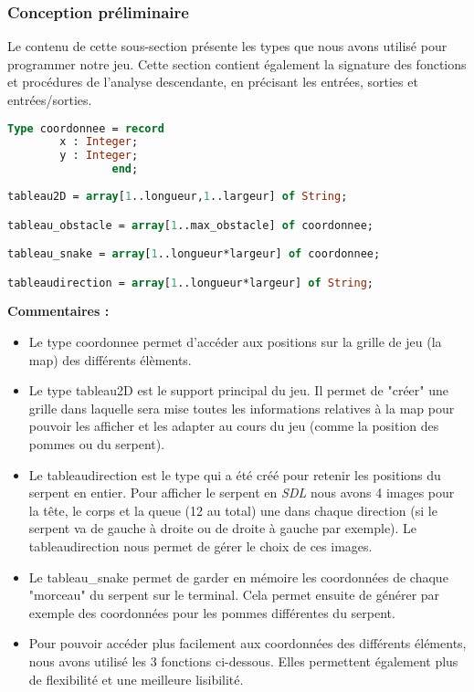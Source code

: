         \subsubsection{Conception préliminaire}
        Le contenu de cette sous-section présente les types que nous avons utilisé pour programmer notre jeu.
        Cette section contient également la signature des fonctions et procédures de l'analyse descendante, en précisant les entrées, sorties et entrées/sorties.

            \begin{lstlisting}[language=Pascal,frame=single,caption=Principaux types utilisés.]
Type coordonnee = record
        x : Integer;
        y : Integer;
                end;                  
                    
tableau2D = array[1..longueur,1..largeur] of String;

tableau_obstacle = array[1..max_obstacle] of coordonnee;	

tableau_snake = array[1..longueur*largeur] of coordonnee;

tableaudirection = array[1..longueur*largeur] of String;

            \end{lstlisting}

            \textbf {Commentaires : } 
                \begin{itemize}
                    \item Le type coordonnee permet d'accéder aux positions sur la grille de jeu (la map) des différents élèments. 
                    \item Le type tableau2D est le support principal du jeu. Il permet de "créer" une grille dans laquelle sera mise toutes les informations relatives à la map pour pouvoir les afficher et les adapter au cours du jeu (comme la position des pommes ou du serpent).
                    \item Le tableaudirection est le type qui a été créé pour retenir les positions du serpent en entier. Pour afficher le serpent en \textit{SDL} nous avons 4 images pour la tête, le corps et la queue (12 au total) une dans chaque direction (si le serpent va de gauche à droite ou de droite à gauche par exemple). Le tableaudirection nous permet de gérer le choix de ces images. 
                    \item Le tableau\_snake permet de  garder en mémoire les coordonnées de chaque "morceau" du serpent sur le terminal. Cela permet ensuite de générer par exemple des coordonnées pour les pommes différentes du serpent.
                    \item Pour pouvoir accéder plus facilement aux coordonnées des différents éléments, nous avons utilisé les 3 fonctions ci-dessous. Elles permettent également plus de flexibilité et une meilleure lisibilité. 
                \end{itemize}
            
